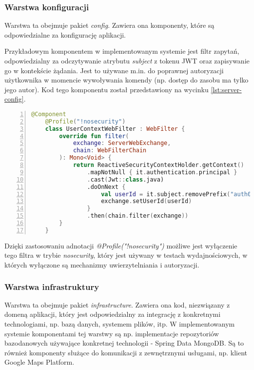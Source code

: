 \subsubsection{Warstwa konfiguracji}

Warstwa ta obejmuje pakiet \textit{config}. Zawiera ona komponenty, które są odpowiedzialne za konfigurację aplikacji.

Przykładowym komponentem w implementowanym systemie jest filtr zapytań, odpowiedzialny za odczytywanie atrybutu \textit{subject} z tokenu JWT oraz zapisywanie go w kontekście żądania. Jest to używane m.in. do poprawnej autoryzacji użytkownika w momencie wywoływania komendy (np. dostęp do zasobu ma tylko jego autor). Kod tego komponentu został przedstawiony na wycinku \ref{lst:server-config}.

\begin{lstlisting}[caption={Kod filtra zapytań},label={lst:server-config},captionpos=b,language=Kotlin,numbers=left,showstringspaces=false]
    @Component
    @Profile("!nosecurity")
    class UserContextWebFilter : WebFilter {
        override fun filter(
            exchange: ServerWebExchange,
            chain: WebFilterChain
        ): Mono<Void> {
            return ReactiveSecurityContextHolder.getContext()
                .mapNotNull { it.authentication.principal }
                .cast(Jwt::class.java)
                .doOnNext {
                    val userId = it.subject.removePrefix("auth0|")
                    exchange.setUserId(userId)
                }
                .then(chain.filter(exchange))
        }
    }
\end{lstlisting}

Dzięki zastosowaniu adnotacji \textit{@Profile("!nosecurity")} możliwe jest wyłączenie tego filtra w trybie \textit{nosecurity}, który jest używany w testach wydajnościowych, w których wyłączone są mechanizmy uwierzytelniania i autoryzacji.

\subsubsection{Warstwa infrastruktury}

Warstwa ta obejmuje pakiet \textit{infrastructure}. Zawiera ona kod, niezwiązany z domeną aplikacji, który jest odpowiedzialny za integrację z konkretnymi technologiami, np. bazą danych, systemem plików, itp. W implementowanym systemie komponentami tej warstwy są np. implementacje repozytoriów bazodanowych używające konkretnej technologii - Spring Data MongoDB. Są to również komponenty służące do komunikacji z zewnętrznymi usługami, np. klient Google Maps Platform.

